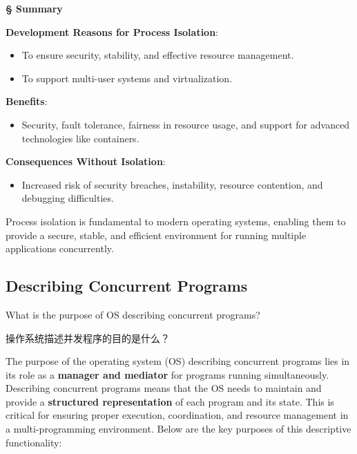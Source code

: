 \documentclass[a4paper]{book}
\newcommand{\sfbf}[1]{{\normalsize\textsf{\textbf{§ #1}}}}
\begin{document}
\hrulefill

\sfbf{Summary}

\textbf{Development Reasons for Process Isolation}:

\begin{itemize}
\item 
To ensure security, stability, and effective resource management.

\item 
To support multi-user systems and virtualization.

\end{itemize}

\textbf{Benefits}:
\begin{itemize}
\item 
Security, fault tolerance, fairness in resource usage, and support for advanced technologies like containers.

\end{itemize}

\textbf{Consequences Without Isolation}:
\begin{itemize}
\item 
Increased risk of security breaches, instability, resource contention, and debugging difficulties.

\end{itemize}

Process isolation is fundamental to modern operating systems, enabling them to provide a secure, stable, and efficient environment for running multiple applications concurrently.

\subsection{Describing Concurrent Programs}

\begin{greenbox}
What is the purpose of OS describing concurrent programs?
\end{greenbox}

操作系统描述并发程序的目的是什么？

The purpose of the operating system (OS) describing concurrent programs lies in its role as a \textbf{manager and mediator} for programs running simultaneously. Describing concurrent programs means that the OS needs to maintain and provide a \textbf{structured representation} of each program and its state. This is critical for ensuring proper execution, coordination, and resource management in a multi-programming environment. Below are the key purposes of this descriptive functionality:
\hrulefill
\end{document}
